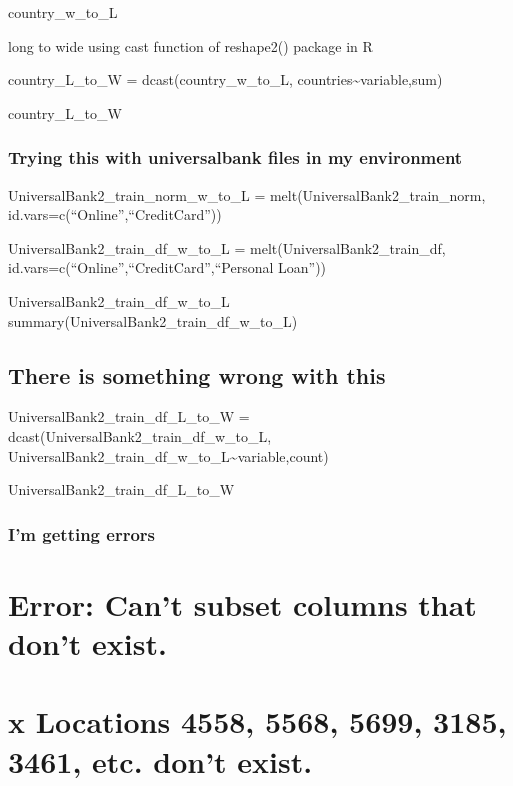 \documentclass[
]{article}
\begin{document}
country\_w\_to\_L

long to wide using cast function of reshape2() package in R

country\_L\_to\_W = dcast(country\_w\_to\_L,
countries\textasciitilde variable,sum)

country\_L\_to\_W

\hypertarget{trying-this-with-universalbank-files-in-my-environment}{%
\subsubsection{Trying this with universalbank files in my
environment}\label{trying-this-with-universalbank-files-in-my-environment}}

UniversalBank2\_train\_norm\_w\_to\_L =
melt(UniversalBank2\_train\_norm, id.vars=c(``Online'',``CreditCard''))

UniversalBank2\_train\_df\_w\_to\_L = melt(UniversalBank2\_train\_df,
id.vars=c(``Online'',``CreditCard'',``Personal Loan''))

UniversalBank2\_train\_df\_w\_to\_L
summary(UniversalBank2\_train\_df\_w\_to\_L)

\hypertarget{there-is-something-wrong-with-this}{%
\subsection{There is something wrong with
this}\label{there-is-something-wrong-with-this}}

UniversalBank2\_train\_df\_L\_to\_W =
dcast(UniversalBank2\_train\_df\_w\_to\_L,
UniversalBank2\_train\_df\_w\_to\_L\textasciitilde variable,count)

UniversalBank2\_train\_df\_L\_to\_W

\hypertarget{im-getting-errors}{%
\subsubsection{I'm getting errors}\label{im-getting-errors}}

\hypertarget{error-cant-subset-columns-that-dont-exist.}{%
\section{Error: Can't subset columns that don't
exist.}\label{error-cant-subset-columns-that-dont-exist.}}

\hypertarget{x-locations-4558-5568-5699-3185-3461-etc.-dont-exist.}{%
\section{x Locations 4558, 5568, 5699, 3185, 3461, etc. don't
exist.}\label{x-locations-4558-5568-5699-3185-3461-etc.-dont-exist.}}
\end{document}
